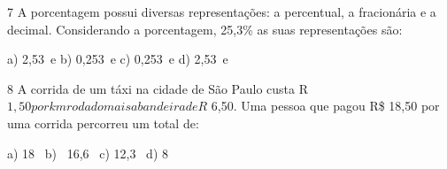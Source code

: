 \num{7} A porcentagem possui diversas representações: a percentual, a
fracionária e a decimal. Considerando a porcentagem, 25,3\% as suas
representações são:

a) 2,53\ e b) 0,253\ e c)
0,253\ e d) 2,53\ e



\num{8} A corrida de um táxi na cidade de São Paulo custa
R\(1,50 por km rodado mais a bandeira de R\) 6,50. Uma pessoa que pagou
R\$ 18,50 por uma corrida percorreu um total de:

a) 18\  b) \ 16,6\  c) 12,3\  d)
8\ 



